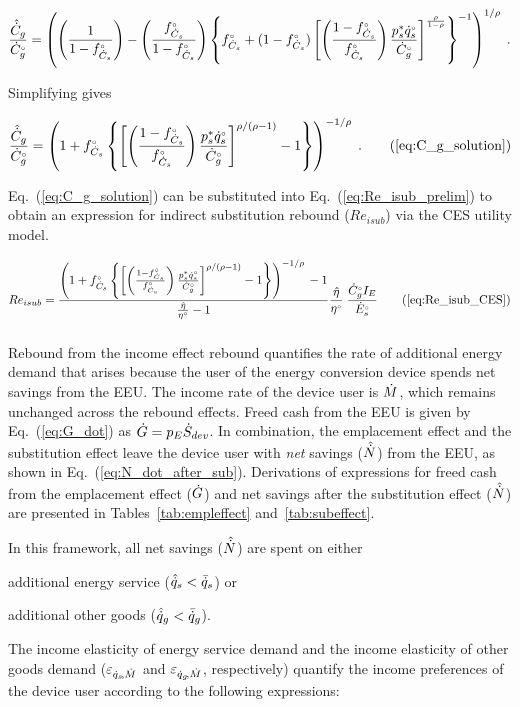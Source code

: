 \begin{equation}
  \frac{\hat{\dot{C}}_g}{{}{\dot{C}}^{\scriptscriptstyle \circ}_g} = \left( \left( \frac{1}{1-{}{f}^{\scriptscriptstyle \circ}_{\dot{C}_s}} \right)
                                     - \left( \frac{{}{f}^{\scriptscriptstyle \circ}_{\dot{C}_s}}{1-{}{f}^{\scriptscriptstyle \circ}_{\dot{C}_s}} \right)
              \left\{ {}{f}^{\scriptscriptstyle \circ}_{\dot{C}_s} + (1-{}{f}^{\scriptscriptstyle \circ}_{\dot{C}_s})
                  \left[ \left( \frac{1-{}{f}^{\scriptscriptstyle \circ}_{\dot{C}_s}}{{}{f}^{\scriptscriptstyle \circ}_{\dot{C}_s}} \right) \frac{{p}^*_s {}{\dot{q}}^{\scriptscriptstyle \circ}_s}{{}{\dot{C}}^{\scriptscriptstyle \circ}_g}   \right]
                      ^{\frac{\rho}{1-\rho}} \right\} ^{-1} \right) ^{1/\rho} \; .
\end{equation}

Simplifying gives

\begin{equation}
  \frac{\rasub{C}_g}{\rbempl{C}_g} = \Cgsolution{} \; . \tag{\ref{eq:C_g_solution}}
\end{equation}

Eq.~(\ref{eq:C_g_solution}) can be substituted into Eq.~(\ref{eq:Re_isub_prelim})
to obtain an expression for indirect substitution rebound ($Re_{isub}$)
via the CES utility model.

\begin{equation}
  Re_{isub} = \ReisubCES{} \tag{\ref{eq:Re_isub_CES}}
\end{equation}


\subsubsection{\Inceffect{}}
\label{sec:Re_inc}

Rebound from the income effect rebound quantifies the rate of additional energy demand
that arises because the user of the energy conversion device spends net
savings from the EEU.
The income rate of the device user is $\dot{M}$,
which remains unchanged across the rebound effects.
Freed cash from the EEU is given by Eq.~(\ref{eq:G_dot})
as $\dot{G} = p_E \dot{S}_{dev}$.
In combination, the emplacement effect and
the substitution effect leave the device user with
\emph{net} savings ($\hat{\dot{N}}$) from the EEU,
as shown in Eq.~(\ref{eq:N_dot_after_sub}).
Derivations of expressions for
freed cash from the emplacement effect ($\dot{G}$) and
net savings after the substitution effect ($\hat{\dot{N}}$)
are presented in Tables~\ref{tab:empleffect} and~\ref{tab:subeffect}.

In this framework, all net savings ($\hat{\dot{N}}$) are spent on either
%
\begin{enumerate*}[label={(\roman*)}]

  \item additional energy service
        ($\hat{\dot{q}}_s < \bar{\dot{q}}_s$) or

  \item additional other goods
        ($\hat{\dot{q}}_g < \bar{\dot{q}}_g$).

\end{enumerate*}
%
The income elasticity of energy service demand and
the income elasticity of other goods demand
($\varepsilon_{\dot{q}_s\!,\dot{M}}$ and $\varepsilon_{\dot{q}_g\!,\dot{M}}$, respectively)
quantify the income preferences of the device user according to the following expressions:

